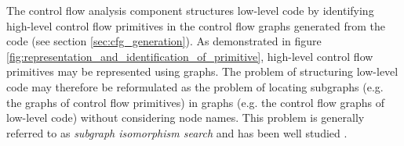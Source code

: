 
The control flow analysis component structures low-level code by identifying high-level control flow primitives in the control flow graphs generated from the code (see section \ref{sec:cfg_generation}). As demonstrated in figure \ref{fig:representation_and_identification_of_primitive}, high-level control flow primitives may be represented using graphs. The problem of structuring low-level code may therefore be reformulated as the problem of locating subgraphs (e.g. the graphs of control flow primitives) in graphs (e.g. the control flow graphs of low-level code) without considering node names. This problem is generally referred to as \textit{subgraph isomorphism search} and has been well studied \cite{subgraph_isomorphism_algorithms}.

